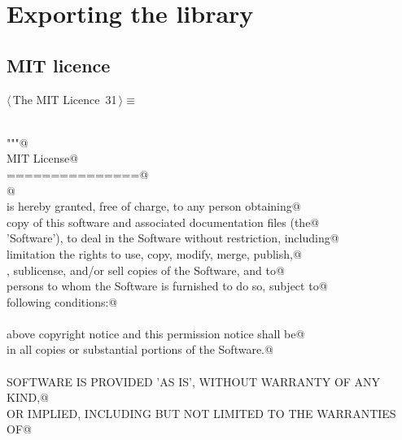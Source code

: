 \documentclass[11pt,oneside]{article}	%
\begin{document}
\section{Exporting the library}

\subsection{MIT licence}
\begin{flushleft} \small \label{scrap54}
\protect{}$\langle\,$The MIT Licence\nobreak\ {\footnotesize 31}$\,\rangle\equiv$
\vspace{-1ex}
\begin{list}{}{} \item
\mbox{}\verb@@\\
\mbox{}\verb@"""@\\
\mbox{}\verb@The MIT License@\\
\mbox{}\verb@===============@\\
\mbox{}\verb@   @\\
\mbox{}\verb@Permission is hereby granted, free of charge, to any person obtaining@\\
\mbox{}\verb@a copy of this software and associated documentation files (the@\\
\mbox{}\verb@'Software'), to deal in the Software without restriction, including@\\
\mbox{}\verb@without limitation the rights to use, copy, modify, merge, publish,@\\
\mbox{}\verb@distribute, sublicense, and/or sell copies of the Software, and to@\\
\mbox{}\verb@permit persons to whom the Software is furnished to do so, subject to@\\
\mbox{}\verb@the following conditions:@\\
\mbox{}\verb@@\\
\mbox{}\verb@The above copyright notice and this permission notice shall be@\\
\mbox{}\verb@included in all copies or substantial portions of the Software.@\\
\mbox{}\verb@@\\
\mbox{}\verb@THE SOFTWARE IS PROVIDED 'AS IS', WITHOUT WARRANTY OF ANY KIND,@\\
\mbox{}\verb@EXPRESS OR IMPLIED, INCLUDING BUT NOT LIMITED TO THE WARRANTIES OF@\\

\end{list}
\end{flushleft}
\end{document}

